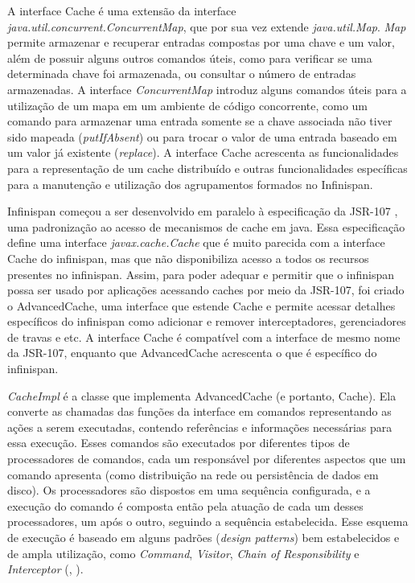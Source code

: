 \documentclass[11pt,twoside,a4paper]{book}
\begin{document}
A interface Cache é uma extensão da interface \emph{java.util.concurrent.ConcurrentMap}, que por sua vez extende \emph{java.util.Map}. \emph{Map} permite armazenar e recuperar entradas compostas por uma chave e um valor, além de possuir alguns outros comandos úteis, como para verificar se uma determinada chave foi armazenada, ou consultar o número de entradas armazenadas. A interface \emph{ConcurrentMap} introduz alguns comandos úteis para a utilização de um mapa em um ambiente de código concorrente, como um comando para armazenar uma entrada somente se a chave associada não tiver sido mapeada (\emph{putIfAbsent}) ou para trocar o valor de uma entrada baseado em um valor já existente (\emph{replace}). A interface Cache acrescenta as funcionalidades para a representação de um cache distribuído e outras funcionalidades específicas para a manutenção e utilização dos agrupamentos formados no Infinispan.

Infinispan começou a ser desenvolvido em paralelo à especificação da JSR-107 \cite{jsr107}, uma padronização ao acesso de mecanismos de cache em java. Essa especificação define uma interface \emph{javax.cache.Cache} que é muito parecida com a interface Cache do infinispan, mas que não disponibiliza acesso a todos os recursos presentes no infinispan. Assim, para poder adequar e permitir que o infinispan possa ser usado por aplicações acessando caches por meio da JSR-107, foi criado o AdvancedCache, uma interface que estende Cache e permite acessar detalhes específicos do infinispan como adicionar e remover interceptadores, gerenciadores de travas e etc. A interface Cache é compatível com a interface de mesmo nome da JSR-107, enquanto que AdvancedCache acrescenta o que é específico do infinispan.

\emph{CacheImpl} é a classe que implementa AdvancedCache (e portanto, Cache). Ela converte as chamadas das funções da interface em comandos representando as ações a serem executadas, contendo referências e informações necessárias para essa execução. Esses comandos são executados por diferentes tipos de processadores de comandos, cada um responsável por diferentes aspectos que um comando apresenta (como distribuição na rede ou persistência de dados em disco). Os processadores são dispostos em uma sequência configurada, e a execução do comando é composta então pela atuação de cada um desses processadores, um após o outro, seguindo a sequência estabelecida. Esse esquema de execução é baseado em alguns padrões (\emph{design patterns}) bem estabelecidos e de ampla utilização, como \emph{Command}, \emph{Visitor}, \emph{Chain of Responsibility} e \emph{Interceptor} (\cite{design_patterns}, \cite{posa}).
\end{document}
